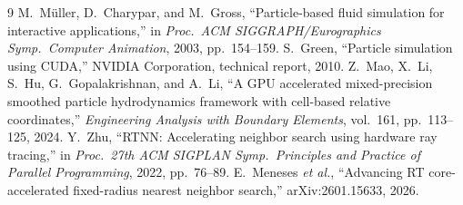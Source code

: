 \documentclass[11pt]{article}
\begin{document}
\begin{thebibliography}{9}
 M.~M\"uller, D.~Charypar, and M.~Gross, ``Particle-based fluid simulation for interactive applications,'' in \emph{Proc.\ ACM SIGGRAPH/Eurographics Symp.\ Computer Animation}, 2003, pp.~154--159.
 S.~Green, ``Particle simulation using CUDA,'' NVIDIA Corporation, technical report, 2010.
 Z.~Mao, X.~Li, S.~Hu, G.~Gopalakrishnan, and A.~Li, ``A GPU accelerated mixed-precision smoothed particle hydrodynamics framework with cell-based relative coordinates,'' \emph{Engineering Analysis with Boundary Elements}, vol.~161, pp.~113--125, 2024.
 Y.~Zhu, ``RTNN: Accelerating neighbor search using hardware ray tracing,'' in \emph{Proc.\ 27th ACM SIGPLAN Symp.\ Principles and Practice of Parallel Programming}, 2022, pp.~76--89.
 E.~Meneses \emph{et al.}, ``Advancing RT core-accelerated fixed-radius nearest neighbor search,'' arXiv:2601.15633, 2026.
\end{thebibliography}
\end{document}
